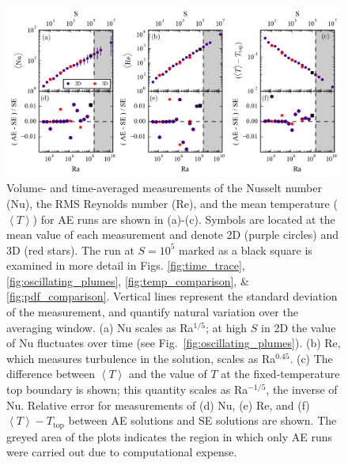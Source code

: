 \documentclass[aps, pre, onecolumn, nofootinbib, notitlepage, groupedaddress, amsfonts, amssymb, amsmath, longbibliography]{revtex4-1}
\newcommand{\angles}[1]{\ensuremath{\left\langle #1 \right\rangle}}
\begin{document}
\begin{figure}[b!]
\includegraphics[width=\textwidth]{./figs/parameter_space_comparison.png}
\caption{Volume- and time-averaged measurements of the Nusselt number (Nu), the
RMS Reynolds number (Re), and the mean temperature ($\angles{T}$) for AE runs are shown in (a)-(c).
Symbols are located at the mean value of
each measurement and denote 2D (purple circles) and 3D (red stars). 
The run at $S = 10^5$ marked as a
black square is examined in more detail in Figs. \ref{fig:time_trace}, \ref{fig:oscillating_plumes},
\ref{fig:temp_comparison}, \& \ref{fig:pdf_comparison}.
Vertical lines represent the standard deviation of the measurement,
and quantify natural variation over the averaging window. 
(a) Nu scales as Ra$^{1/5}$; at high $S$ in 2D the value of Nu fluctuates over time
(see Fig.~\ref{fig:oscillating_plumes}).  
(b) Re, which measures turbulence in the solution, scales as
Ra$^{0.45}$. (c) The difference between $\angles{T}$ and the value of $T$ at the fixed-temperature
top boundary is shown; this quantity scales as Ra$^{-1/5}$, the inverse of Nu.
Relative error for measurements of (d) Nu, (e) Re, and (f) $\angles{T} - T_{\text{top}}$ between 
AE solutions and SE solutions are shown.
The greyed area of the plots indicates the region in which only AE runs were
carried out due to computational expense. \label{fig:parameter_space_comparison} }
\end{figure}
\end{document}
